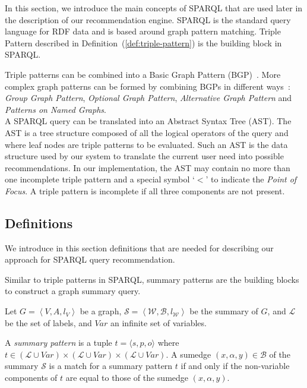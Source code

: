 In this section, we introduce the main concepts of SPARQL that are used later in the description of our recommendation engine. SPARQL is the standard query language for RDF data and is based around graph pattern matching. Triple Pattern described in Definition~(\ref{def:triple-pattern}) is the building block in SPARQL.

Triple patterns can be combined into a Basic Graph Pattern (BGP)~\cite{PrudS08}. More complex graph patterns can be formed by combining BGPs in different ways~\cite{PrudS08}: \emph{Group Graph Pattern}, \emph{Optional Graph Pattern}, \emph{Alternative Graph Pattern} and \emph{Patterns on Named Graphs}.\\

A SPARQL query can be translated into an Abstract Syntax Tree (AST). The AST is a tree structure composed of all the logical operators of the query and where leaf nodes are triple patterns to be evaluated. Such an AST is the data structure used by our system to translate the current user need into possible recommendations. In our implementation, the AST may contain no more than one incomplete triple pattern and a special symbol `$<$' to indicate the \emph{Point of Focus}. A triple pattern is incomplete if all three components are not present.

\subsection{Definitions}

We introduce in this section definitions that are needed for describing our approach for SPARQL query recommendation.

Similar to triple patterns in SPARQL, summary patterns are the building blocks to construct a graph summary query.

\begin{definition}
	Let $G=\left\langle V, A, l_V \right\rangle$ be a graph, $\mathcal{S} = \left\langle \mathcal{W}, \mathcal{B}, l_{\mathcal{W}} \right\rangle$ be the summary of $G$, and $\mathcal{L}$ be the set of labels, and $Var$ an infinite set of variables.

	A \emph{summary pattern} is a tuple $t = \langle s, p, o \rangle$ where $t \in (\mathcal{L} \cup Var) \times (\mathcal{L} \cup Var) \times (\mathcal{L} \cup Var)$.
	A sumedge $(x,\alpha,y) \in \mathcal{B}$ of the summary $\mathcal{S}$ is a match for a summary pattern $t$ if and only if the non-variable components of $t$ are equal to those of the sumedge $(x, \alpha, y)$.
	\label{def:summary-triple-pattern}
\end{definition}

